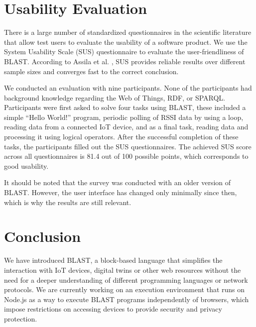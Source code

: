 \documentclass[runningheads]{llncs}
\begin{document}
\section{Usability Evaluation }
There is a large number of standardized questionnaires in the scientific literature that allow test users to evaluate the usability of a software product. We use the System Usability Scale (SUS) questionnaire to evaluate the user-friendliness of BLAST. According to Assila et al. \cite{assila2016standardized}, SUS provides reliable results over different sample sizes and converges fast to the correct conclusion. 

We conducted an evaluation with nine participants. None of the participants had background knowledge regarding the Web of Things, RDF, or SPARQL. Participants were first asked to solve four tasks using BLAST, these included a simple ``Hello World!'' program, periodic polling of RSSI data by using a loop, reading data from a connected IoT device, and as a final task, reading data and processing it using logical operators. After the successful completion of these tasks, the participants filled out the SUS questionnaires. The achieved SUS score across all questionnaires is 81.4 out of 100 possible points, which corresponds to good usability.

It should be noted that the survey was conducted with an older version of BLAST. However, the user interface has changed only minimally since then, which is why the results are still relevant.

\section{Conclusion}

We have introduced BLAST, a block-based language that simplifies the interaction with IoT devices, digital twins or other web resources without the need for a deeper understanding of different programming languages or network protocols.
We are currently working on an execution environment that runs on Node.js as a way to execute BLAST programs independently of browsers, which impose restrictions on accessing devices to provide security and privacy protection.

%
%
%


%
\end{document}
